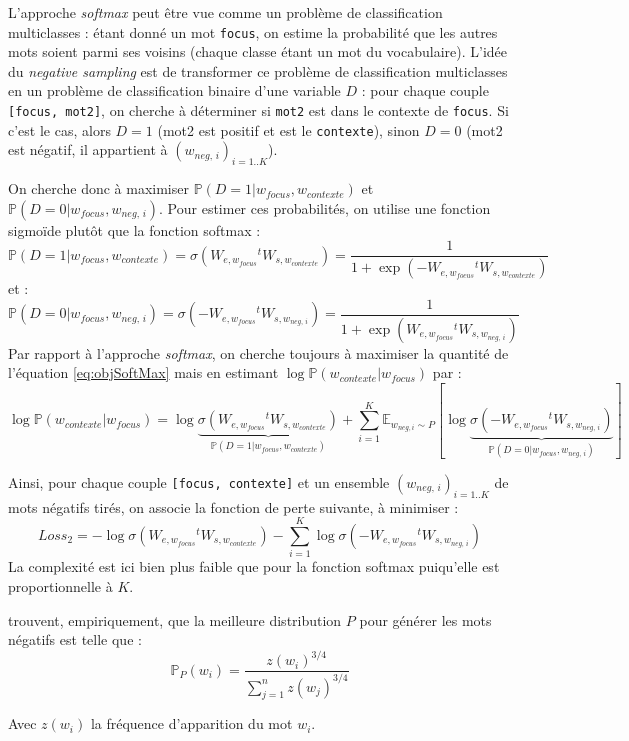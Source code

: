 \documentclass[11pt,french,french]{article}
\begin{document}
L'approche \emph{softmax} peut être vue comme un problème de classification multiclasses : étant donné un mot \texttt{focus}, on estime la probabilité que les autres mots soient parmi ses voisins (chaque classe étant un mot du vocabulaire).
L'idée du \emph{negative sampling} est de transformer ce problème de classification multiclasses en un problème de classification binaire d'une variable \(D\) : pour chaque couple \texttt{{[}focus,\ mot2{]}}, on cherche à déterminer si \texttt{mot2} est dans le contexte de \texttt{focus}. Si c'est le cas, alors \(D=1\) (mot2 est positif et est le \texttt{contexte}), sinon \(D=0\) (mot2 est négatif, il appartient à \((w_{neg,\,i})_{i=1..K}\)).

On cherche donc à maximiser \(\mathbb P(D=1\vert w_{focus},w_{contexte})\) et \(\mathbb P(D=0\vert w_{focus},w_{neg,\,i})\).
Pour estimer ces probabilités, on utilise une fonction sigmoïde plutôt que la fonction softmax :
\[
\mathbb P(D=1\vert w_{focus},w_{contexte})=\sigma(W_{e,w_{focus}}{}^tW_{s,w_{contexte}}) = 
\frac{1}{1+\exp(-W_{e,w_{focus}}{}^tW_{s,w_{contexte}})}
\]
et :
\[
\mathbb P(D=0\vert w_{focus},w_{neg,\,i})=\sigma(-W_{e,w_{focus}}{}^tW_{s,w_{neg,\,i}}) = 
\frac{1}{1+\exp(W_{e,w_{focus}}{}^tW_{s,w_{neg,\,i}})}
\]
Par rapport à l'approche \emph{softmax}, on cherche toujours à maximiser la quantité de l'équation \eqref{eq:objSoftMax} mais en estimant \(\log\mathbb P(w_{contexte}\vert w_{focus})\) par :
\[
\log\mathbb P(w_{contexte}\vert w_{focus}) =
\log\underbrace{\sigma (W_{e,w_{focus}}{}^tW_{s,w_{contexte}})}_{
\mathbb P(D=1\vert w_{focus},w_{contexte})
}+
\sum_{i=1}^K\mathbb E_{w_{neg,i}\sim P}[
\log
\underbrace{\sigma (-W_{e,w_{focus}}{}^tW_{s,w_{neg,\,i}})}_{
\mathbb P(D=0\vert w_{focus},w_{neg,\,i})
}
]
\]

Ainsi, pour chaque couple \texttt{{[}focus,\ contexte{]}} et un ensemble \((w_{neg,\,i})_{i=1..K}\) de mots négatifs tirés, on associe la fonction de perte suivante, à minimiser :
\[
Loss_{2}=-\log\sigma (W_{e,w_{focus}}{}^tW_{s,w_{contexte}})
-
\sum_{i=1}^K
\log
\sigma (-W_{e,w_{focus}}{}^tW_{s,w_{neg,\,i}})
\]
La complexité est ici bien plus faible que pour la fonction softmax puiqu'elle est proportionnelle à \(K\).

\cite{MikolovNS} trouvent, empiriquement, que la meilleure distribution \(P\) pour générer les mots négatifs est telle que :
\[
\mathbb P_P(w_i) = \frac{z(w_i)^{3/4}}{
\sum_{j=1}^n z(w_j)^{3/4}
}
\]

Avec \(z(w_i)\) la fréquence d'apparition du mot \(w_i\).
\end{document}
